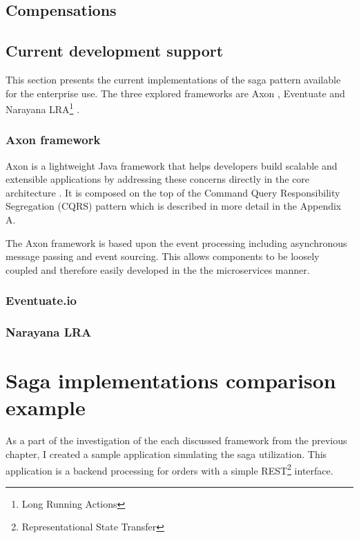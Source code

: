 \documentclass[oneside,
  digital, %
  table,   %
  nolof,     %
  nolot,     %
]{fithesis3}
\begin{document}
\section{Compensations}

\section{Current development support}

This section presents the current implementations of the saga pattern available for the enterprise use. The three explored frameworks are Axon \cite{axon_framework}, Eventuate \cite{eventuate.io} and Narayana LRA\footnote{Long Running Actions} \cite{narayana_lra}.

\subsection{Axon framework}

Axon is a lightweight Java framework that helps developers build scalable and extensible applications by addressing these concerns directly in the core  architecture \cite{axon_framework}. It is composed on the top of the Command Query Responsibility Segregation (CQRS) pattern which is described in more detail in the Appendix A.

The Axon framework is based upon the event processing including asynchronous message passing and event sourcing. This allows components to be loosely coupled and therefore easily developed in the the microservices manner.

\subsection{Eventuate.io}

\subsection{Narayana LRA}

\clearpage
\chapter{Saga implementations comparison example}

As a part of the investigation of the each discussed framework from the previous chapter, I created a sample application simulating the saga utilization. This application is a backend processing for orders with a simple REST\footnote{Representational State Transfer} interface. 
\end{document}

